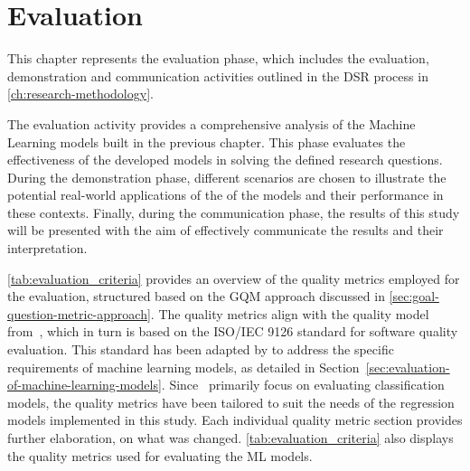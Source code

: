 \chapter{Evaluation}\label{ch:evaluation}
This chapter represents the evaluation phase, which includes the evaluation, demonstration and
communication activities outlined in the \ac{DSR} process in \cref{ch:research-methodology}.

The evaluation activity provides a comprehensive analysis of the Machine Learning models built in the
previous chapter.
This phase evaluates the effectiveness of the developed models in solving the defined research questions.
During the demonstration phase, different scenarios are chosen to illustrate the potential real-world applications of
the of the models and their performance in these contexts.
Finally, during the communication phase, the results of this study will be presented with the aim of effectively
communicate the results and their interpretation.

\cref{tab:evaluation_criteria} provides an overview of the quality metrics employed for the evaluation,
structured based on the \ac{GQM} approach discussed in \cref{sec:goal-question-metric-approach}.
The quality metrics align with the quality model from~\cite{siebert2022construction}, which in turn is based on
the ISO/IEC 9126 standard for software quality evaluation.
This standard has been adapted by\cite{siebert2022construction} to address the specific requirements of machine
learning models, as detailed in Section~\ref{sec:evaluation-of-machine-learning-models}.
Since~\cite{siebert2022construction} primarily focus on evaluating classification models, the quality metrics have
been tailored to suit the needs of the regression models implemented in this study.
Each individual quality metric section provides further elaboration, on what was changed.
\cref{tab:evaluation_criteria} also displays the quality metrics used for evaluating the \ac{ML} models.

